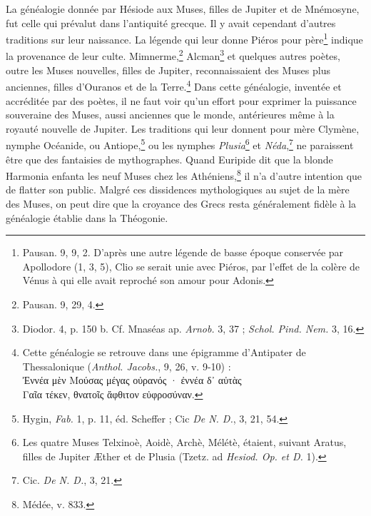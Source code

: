 \documentclass[landscape, a4paper, 11pt, oneside, polutonikogreek, french]{article}
\begin{document}
La généalogie donnée par Hésiode aux Muses, filles de Jupiter et de Mnémosyne, fut celle qui prévalut dans l'antiquité grecque. Il y avait cependant d'autres traditions sur leur naissance. La légende qui leur donne Piéros pour père\footnote{Pausan. 9, 9, 2. D'après une autre légende de basse époque conservée par Apollodore (1, 3, 5), Clio se serait unie avec Piéros, par l'effet de la colère de Vénus à qui elle avait reproché son amour pour Adonis.} indique la provenance de leur culte. Mimnerme,\footnote{Pausan. 9, 29, 4.} Alcman\footnote{Diodor. 4, p. 150 b. Cf. Mnaséas ap. \emph{Arnob.} 3, 37 ; \emph{Schol. Pind. Nem.} 3, 16.} et quelques autres poètes, outre les Muses nouvelles, filles de Jupiter, reconnaissaient des Muses plus anciennes, filles d'Ouranos et de la Terre.\footnote{Cette généalogie se retrouve dans une épigramme d'Antipater de Thessalonique (\emph{Anthol. Jacobs.}, 9, 26, v. 9-10) :\\\hspace*{5mm}Ἐννέα μὲν Μούσας μέγας οὐρανός · ἐννέα δ᾽ αὐτὰς\\\hspace*{5mm}Γαῖα τέκεν, θνατοῖς ἄφθιτον εὐφροσύναν.} Dans cette généalogie, inventée et accréditée par des poètes, il ne faut voir qu'un effort pour exprimer la puissance souveraine des Muses, aussi anciennes que le monde, antérieures même à la royauté nouvelle de Jupiter. Les traditions qui leur donnent pour mère Clymène, nymphe Océanide, ou Antiope,\footnote{Hygin, \emph{Fab.} 1, p. 11, éd. Scheffer ; Cic \emph{De N. D.}, 3, 21, 54.} ou les nymphes \emph{Plusia}\footnote{Les quatre Muses Telxinoè, Aoidè, Archè, Mélétè, étaient, suivant Aratus, filles de Jupiter Æther et de Plusia (Tzetz. ad \emph{Hesiod. Op. et D.} 1).} et \emph{Néda},\footnote{Cic. \emph{De N. D.}, 3, 21.} ne paraissent être que des fantaisies de mythographes. Quand Euripide dit que la blonde Harmonia enfanta les neuf Muses chez les Athéniens,\footnote{Médée, v. 833.} il n'a d'autre intention que de flatter son public. Malgré ces dissidences mythologiques au sujet de la mère des Muses, on peut dire que la croyance des Grecs resta généralement fidèle à la généalogie établie dans la Théogonie.
\end{document}
